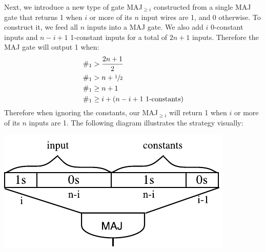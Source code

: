 \documentclass{article}
\begin{document}
\begin{enumerate}
Next, we introduce a new type of gate MAJ$_{\geq i}$ constructed from a single MAJ gate that returns 1 when $i$ or more of its $n$ input wires are 1, and 0 otherwise. To construct it, we feed all $n$ inputs into a MAJ gate. We also add $i$ 0-constant inputs and $n-i+1$ 1-constant inputs for a total of $2n+1$ inputs. Therefore the MAJ gate will output 1 when:
\begin{align*}
\#_1 &> \frac{2n+1}{2} \\
\#_1 &> n + \sfrac{1}{2} \\
\#_1 &\geq n + 1 \\
\#_1 &\geq i + (n-i+1 \text{ 1-constants})
\end{align*}
Therefore when ignoring the constants, our MAJ$_{\geq i}$ will return 1 when $i$ or more of its $n$ inputs are 1. The following diagram illustrates the strategy visually:

\includegraphics{q3_maj_geq.pdf}

\end{enumerate}
\end{document}

